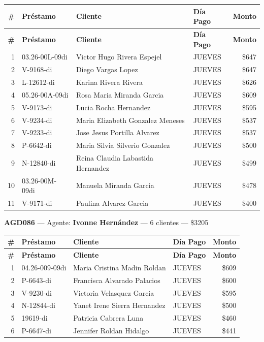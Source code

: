 \documentclass[11pt,a4paper]{article}
\newcommand{\money}[1]{\$\num{#1}}
\begin{document}
\begin{center}
\renewcommand{\arraystretch}{1.1}
\footnotesize
\begin{longtable}{rlp{6.5cm}lr}
\toprule
\textbf{\#} & \textbf{Pr\'estamo} & \textbf{Cliente} & \textbf{D\'ia Pago} & \textbf{Monto} \\
\midrule
\endfirsthead
\toprule
\textbf{\#} & \textbf{Pr\'estamo} & \textbf{Cliente} & \textbf{D\'ia Pago} & \textbf{Monto} \\
\midrule
\endhead
1 & 03.26-00L-09di & Victor Hugo Rivera Espejel & JUEVES & \money{647} \\
2 & V-9168-di & Diego Vargas Lopez & JUEVES & \money{647} \\
3 & L-12612-di & Karina Rivera Rivera & JUEVES & \money{626} \\
4 & 05.26-00A-09di & Rosa Maria Miranda Garcia & JUEVES & \money{609} \\
5 & V-9173-di & Lucia Rocha Hernandez & JUEVES & \money{595} \\
6 & V-9234-di & Maria Elizabeth Gonzalez Meneses & JUEVES & \money{537} \\
7 & V-9233-di & Jose Jesus Portilla Alvarez & JUEVES & \money{537} \\
8 & P-6642-di & Maria Silvia Silverio Gonzalez & JUEVES & \money{500} \\
9 & N-12840-di & Reina Claudia Labastida Hernandez & JUEVES & \money{499} \\
10 & 03.26-00M-09di & Manuela Miranda Garcia & JUEVES & \money{478} \\
11 & V-9171-di & Paulina Alvarez Garcia & JUEVES & \money{400} \\

\bottomrule
\end{longtable}
\end{center}
\noindent\textbf{AGD086} --- Agente: \textbf{Ivonne Hernández} --- 6 clientes --- \money{3205}


\begin{center}
\renewcommand{\arraystretch}{1.1}
\footnotesize
\begin{longtable}{rlp{6.5cm}lr}
\toprule
\textbf{\#} & \textbf{Pr\'estamo} & \textbf{Cliente} & \textbf{D\'ia Pago} & \textbf{Monto} \\
\midrule
\endfirsthead
\toprule
\textbf{\#} & \textbf{Pr\'estamo} & \textbf{Cliente} & \textbf{D\'ia Pago} & \textbf{Monto} \\
\midrule
\endhead
1 & 04.26-009-09di & Maria Cristina Madin Roldan & JUEVES & \money{609} \\
2 & P-6643-di & Francisca Alvarado Palacios & JUEVES & \money{600} \\
3 & V-9230-di & Victoria Velasquez Garcia & JUEVES & \money{595} \\
4 & N-12844-di & Yanet Irene Sierra Hernandez & JUEVES & \money{500} \\
5 & 19619-di & Patricia Cabrera Luna & JUEVES & \money{460} \\
6 & P-6647-di & Jennifer Roldan Hidalgo & JUEVES & \money{441} \\

\bottomrule
\end{longtable}
\end{center}
\end{document}
